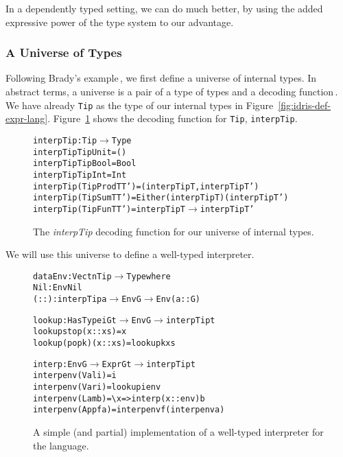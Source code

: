 In a dependently typed setting, we can do much better, by using the added expressive power of the type system to our advantage.

\subsubsection{A Universe of Types}
Following Brady's example\,\cite{Brady:IdrisTutorial}, we first define a universe of internal types. In abstract terms, a universe is a pair of a type of types and a decoding function\,\cite{Oury:2008}. We have already \texttt{Tip} as the type of our internal types in Figure~\ref{fig:idris-def-expr-lang}. Figure~\ref{fig:interpTip} shows the decoding function for \texttt{Tip}, \texttt{interpTip}.

\begin{figure}
\begin{alltt}
interpTip : Tip \(\rightarrow\) Type
interpTip TipUnit        = ()
interpTip TipBool        = Bool
interpTip TipInt         = Int
interpTip (TipProd T T') = (interpTip T, interpTip T')
interpTip (TipSum T T')  = Either (interpTip T) (interpTip T')
interpTip (TipFun T T')  = interpTip T \(\rightarrow\) interpTip T'
\end{alltt}
\caption{The \textit{interpTip} decoding function for our universe of internal types.}
\label{fig:interpTip}
\end{figure}

We will use this universe to define a well-typed interpreter.

\begin{figure}
\begin{alltt}
data Env : Vect n Tip \(\rightarrow\) Type where
  Nil  : Env Nil
  (::) : interpTip a \(\rightarrow\) Env G \(\rightarrow\) Env (a :: G)

lookup : HasType i G t \(\rightarrow\) Env G \(\rightarrow\) interpTip t
lookup stop    (x :: xs) = x
lookup (pop k) (x :: xs) = lookup k xs

interp : Env G \(\rightarrow\) Expr G t \(\rightarrow\) interpTip t
interp env (Val i)   = i
interp env (Var i)   = lookup i env
interp env (Lam b)   = \textbackslash{x} => interp (x :: env) b
interp env (App f a) = interp env f (interp env a)
\end{alltt}
\caption{A simple (and partial) implementation of a well-typed interpreter for the language.}
\label{fig:well-typed-interpreter}
\end{figure}

